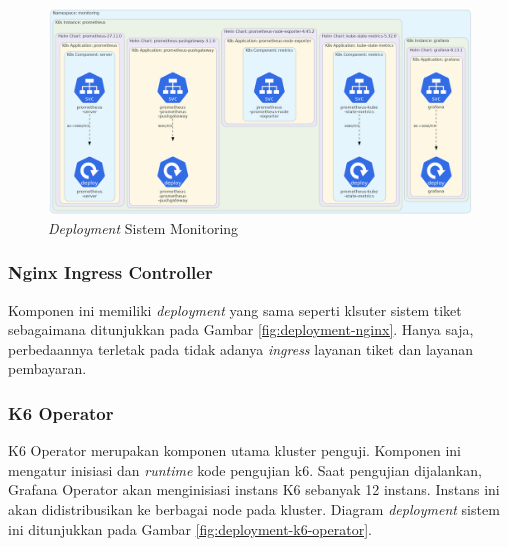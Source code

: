 \begin{figure}[htbp]
    \centering
    \includegraphics[width=1\textwidth]{resources/chapter-4/agent-monitoring.png}
    \caption{\textit{Deployment} Sistem Monitoring}
    \label{fig:deployment-monitoring-agent}
\end{figure}

\subsubsection{Nginx Ingress Controller}

Komponen ini memiliki \textit{deployment} yang sama seperti klsuter sistem tiket sebagaimana ditunjukkan pada Gambar \ref{fig:deployment-nginx}. Hanya saja, perbedaannya terletak pada tidak adanya \textit{ingress} layanan tiket dan layanan pembayaran.

\pagebreak

\subsubsection{K6 Operator}

K6 Operator merupakan komponen utama kluster penguji. Komponen ini mengatur inisiasi dan \textit{runtime} kode pengujian k6. Saat pengujian dijalankan, Grafana Operator akan menginisiasi instans K6 sebanyak 12 instans. Instans ini akan didistribusikan ke berbagai node pada kluster. Diagram \textit{deployment} sistem ini ditunjukkan pada Gambar \ref{fig:deployment-k6-operator}.

